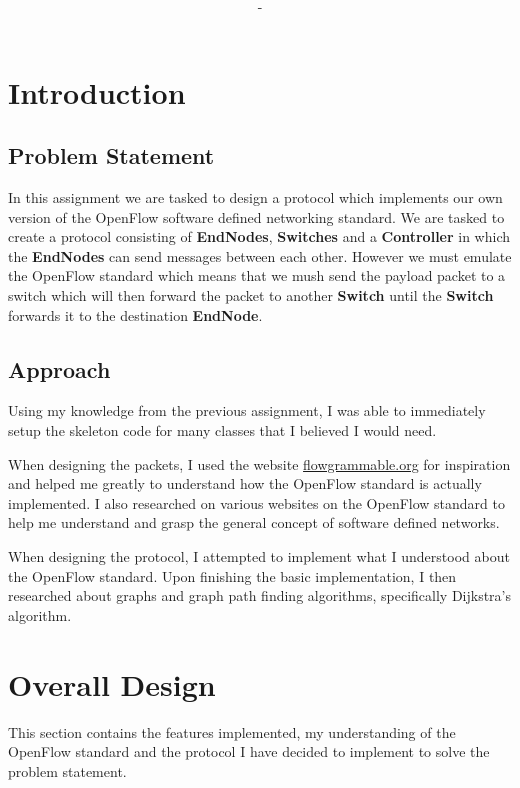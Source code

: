 \documentclass{article}
\title{\textbf{\moduleCode\ \moduleName\ \assignmentTitle}}
\author{\authorName\ -\ \authorID}
\begin{document}
\captionsetup{width=.8\linewidth}

\maketitle
\tableofcontents

\newpage

\section{Introduction}

\subsection{Problem Statement}
In this assignment we are tasked to design a protocol which implements our own
version of the OpenFlow software defined networking standard. We are tasked to
create a protocol consisting of \textbf{EndNodes}, \textbf{Switches} and a
\textbf{Controller} in which the \textbf{EndNodes} can send messages between
each other. However we must emulate the OpenFlow standard which means that we
mush send the payload packet to a switch which will then forward the packet to
another \textbf{Switch} until the \textbf{Switch} forwards it to the destination
\textbf{EndNode}.

\subsection{Approach}
Using my knowledge from the previous assignment, I was able to immediately
setup the skeleton code for many classes that I believed I would need.

When designing the packets, I used the website
\href{http://flowgrammable.org/sdn/openflow/message-layer/}{flowgrammable.org}
for inspiration and helped me greatly to understand how the OpenFlow standard
is actually implemented. I also researched on various websites on the OpenFlow
standard to help me understand and grasp the general concept of software defined
networks.

When designing the protocol, I attempted to implement what I understood about
the OpenFlow standard. Upon finishing the basic implementation, I then
researched about graphs and graph path finding algorithms, specifically
Dijkstra's algorithm.

\section{Overall Design}
This section contains the features implemented, my understanding of the
OpenFlow standard and the protocol I have decided to implement to solve the
problem statement.
\end{document}
